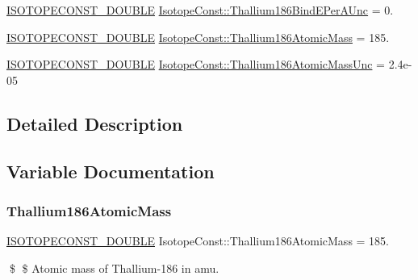 \begin{DoxyCompactItemize}
\mbox{\hyperlink{group___isotope_const-_macros_ga8f45a7272ce02c0b4c65c44636ed719a}{I\+S\+O\+T\+O\+P\+E\+C\+O\+N\+S\+T\+\_\+\+D\+O\+U\+B\+LE}} \mbox{\hyperlink{group___isotope_const-_thallium-_tl186_gab96d9d900ce1f6f6531a72802ccdfbc6}{Isotope\+Const\+::\+Thallium186\+Bind\+E\+Per\+A\+Unc}} = 0.
\item 
\mbox{\hyperlink{group___isotope_const-_macros_ga8f45a7272ce02c0b4c65c44636ed719a}{I\+S\+O\+T\+O\+P\+E\+C\+O\+N\+S\+T\+\_\+\+D\+O\+U\+B\+LE}} \mbox{\hyperlink{group___isotope_const-_thallium-_tl186_gaaee866a0609591cd4e382bddde427642}{Isotope\+Const\+::\+Thallium186\+Atomic\+Mass}} = 185.
\item 
\mbox{\hyperlink{group___isotope_const-_macros_ga8f45a7272ce02c0b4c65c44636ed719a}{I\+S\+O\+T\+O\+P\+E\+C\+O\+N\+S\+T\+\_\+\+D\+O\+U\+B\+LE}} \mbox{\hyperlink{group___isotope_const-_thallium-_tl186_ga3b0f821436085296b9182238cdbdf401}{Isotope\+Const\+::\+Thallium186\+Atomic\+Mass\+Unc}} = 2.\+4e-\/05
\end{DoxyCompactItemize}


\subsection{Detailed Description}


\subsection{Variable Documentation}
\mbox{\label{group___isotope_const-_thallium-_tl186_gaaee866a0609591cd4e382bddde427642}} 
\subsubsection{\texorpdfstring{Thallium186\+Atomic\+Mass}{Thallium186AtomicMass}}
{\footnotesize\ttfamily \mbox{\hyperlink{group___isotope_const-_macros_ga8f45a7272ce02c0b4c65c44636ed719a}{I\+S\+O\+T\+O\+P\+E\+C\+O\+N\+S\+T\+\_\+\+D\+O\+U\+B\+LE}} Isotope\+Const\+::\+Thallium186\+Atomic\+Mass = 185.}

\$ \$ Atomic mass of Thallium-\/186 in amu. \mbox{\label{group___isotope_const-_thallium-_tl186_ga3b0f821436085296b9182238cdbdf401}} 
